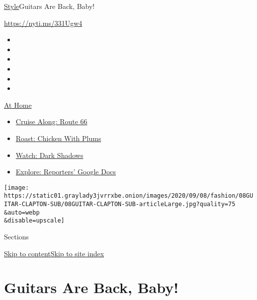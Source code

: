 \href{/section/style}{Style}\textbar{}Guitars Are Back, Baby!

\url{https://nyti.ms/331Ugw4}

\begin{itemize}
\item
\item
\item
\item
\item
\item
\end{itemize}

\href{https://www.nytimes3xbfgragh.onion/spotlight/at-home?action=click\&pgtype=Article\&state=default\&region=TOP_BANNER\&context=at_home_menu}{At
Home}

\begin{itemize}
\tightlist
\item
  \href{https://www.nytimes3xbfgragh.onion/2020/09/07/travel/route-66.html?action=click\&pgtype=Article\&state=default\&region=TOP_BANNER\&context=at_home_menu}{Cruise
  Along: Route 66}
\item
  \href{https://www.nytimes3xbfgragh.onion/2020/09/04/dining/sheet-pan-chicken.html?action=click\&pgtype=Article\&state=default\&region=TOP_BANNER\&context=at_home_menu}{Roast:
  Chicken With Plums}
\item
  \href{https://www.nytimes3xbfgragh.onion/2020/09/04/arts/television/dark-shadows-stream.html?action=click\&pgtype=Article\&state=default\&region=TOP_BANNER\&context=at_home_menu}{Watch:
  Dark Shadows}
\item
  \href{https://www.nytimes3xbfgragh.onion/interactive/2020/at-home/even-more-reporters-editors-diaries-lists-recommendations.html?action=click\&pgtype=Article\&state=default\&region=TOP_BANNER\&context=at_home_menu}{Explore:
  Reporters' Google Docs}
\end{itemize}

\texttt{[image: https://static01.graylady3jvrrxbe.onion/images/2020/09/08/fashion/08GUITAR-CLAPTON-SUB/08GUITAR-CLAPTON-SUB-articleLarge.jpg?quality=75\\\&auto=webp\\\&disable=upscale]}

Sections

\protect\hyperlink{site-content}{Skip to
content}\protect\hyperlink{site-index}{Skip to site index}

\hypertarget{guitars-are-back-baby}{%
\section{Guitars Are Back, Baby!}\label{guitars-are-back-baby}}

